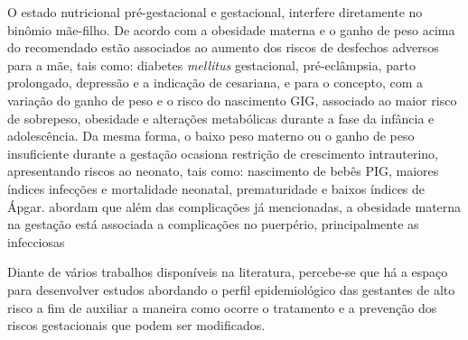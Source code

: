 O estado nutricional pré-gestacional e gestacional, interfere diretamente no binômio mãe-filho. De acordo com   a obesidade materna e o ganho de peso acima do recomendado estão associados ao aumento dos riscos de desfechos adversos para a mãe, tais como:  diabetes \textit{mellitus} gestacional, pré-eclâmpsia, parto prolongado, depressão e a indicação de cesariana, e para o concepto, com a variação do ganho de peso e o risco do nascimento \ac{GIG}, associado ao maior risco de sobrepeso, obesidade e alterações metabólicas durante a fase da infância e adolescência. Da mesma forma, o baixo peso materno ou o ganho de peso insuficiente durante a gestação ocasiona restrição de crescimento intrauterino, apresentando riscos ao neonato, tais como: nascimento de bebês \ac{PIG}, maiores índices infecções e mortalidade neonatal, prematuridade e baixos índices de Ápgar.  abordam que além das complicações já mencionadas, a obesidade materna na gestação está associada a complicações no puerpério, principalmente as infecciosas


Diante de vários trabalhos disponíveis na literatura, percebe-se que há a espaço para desenvolver estudos  abordando o perfil epidemiológico das gestantes de alto risco a fim de auxiliar a maneira como ocorre o tratamento e a prevenção dos riscos gestacionais que podem ser modificados.
 
